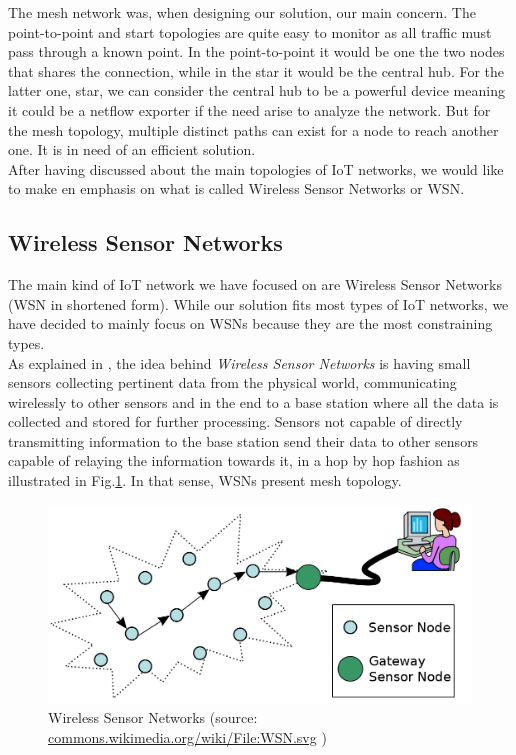The mesh network was, when designing our solution, our main concern. The point-to-point and start topologies are quite easy to monitor as all traffic must pass through a known point. In the point-to-point it would be one the two nodes that shares the connection, while in the star it would be the central hub. For the latter one, star, we can consider the central hub to be a powerful device meaning it could be a netflow exporter if the need arise to analyze the network. But for the mesh topology, multiple distinct paths can exist for a node to reach another one. It is in need of an efficient solution. \\

After having discussed about the main topologies of IoT networks, we would like to make en emphasis on what is called Wireless Sensor Networks or WSN.


\subsection*{Wireless Sensor Networks}

The main kind of IoT network we have focused on are Wireless Sensor Networks (WSN in shortened form). While our solution fits most types of IoT networks, we have decided to mainly focus on WSNs because they are the most constraining types.\\

As explained in \cite{vasseur2010interconnecting}, the idea behind \textit{Wireless Sensor Networks} is having small sensors collecting pertinent data from the physical world, communicating wirelessly to other sensors and in the end to a base station where all the data is collected and stored for further processing. Sensors not capable of directly transmitting information to the base station send their data to other sensors capable of relaying the information towards it, in a hop by hop fashion as illustrated in Fig.\ref{fig:wsn}. In that sense, WSNs present mesh topology.\\

\begin{figure}
  \centering
  \includegraphics[width=\textwidth]{res/wsn.png}
  \caption{Wireless Sensor Networks (source: \url{commons.wikimedia.org/wiki/File:WSN.svg} )}
  \label{fig:wsn}
\end{figure}


